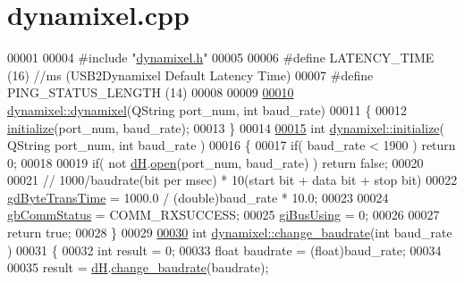 \hypertarget{a00012_source}{}\section{dynamixel.\+cpp}
\label{a00012_source}

\begin{DoxyCode}
00001 
00004 \textcolor{preprocessor}{#include "\hyperlink{a00013}{dynamixel.h}"}
00005 
00006 \textcolor{preprocessor}{#define LATENCY\_TIME        (16) //ms (USB2Dynamixel Default Latency Time)}
00007 \textcolor{preprocessor}{#define PING\_STATUS\_LENGTH  (14)}
00008 
00009 
\hypertarget{a00012_source_l00010}{}\hyperlink{a00003_a5d4fed957a4b2d1690c0fa72127f5cbf}{00010} \hyperlink{a00003_a7aa668a213db6a41bede8e08a6fec830}{dynamixel::dynamixel}(QString port\_num, \textcolor{keywordtype}{int} baud\_rate)
00011 \{
00012     \hyperlink{a00003_a87960244d5846ae7583e37d2407eb61e}{initialize}(port\_num, baud\_rate);
00013 \}
00014 
\hypertarget{a00012_source_l00015}{}\hyperlink{a00003_a87960244d5846ae7583e37d2407eb61e}{00015} \textcolor{keywordtype}{int} \hyperlink{a00003_a87960244d5846ae7583e37d2407eb61e}{dynamixel::initialize}( QString port\_num, \textcolor{keywordtype}{int} baud\_rate )
00016 \{
00017     \textcolor{keywordflow}{if}( baud\_rate < 1900 ) \textcolor{keywordflow}{return} 0;
00018 
00019     \textcolor{keywordflow}{if}( not \hyperlink{a00003_ae003cc90ada6d7b70eaa4ea9d42d4deb}{dH}.\hyperlink{a00002_ab631c2a5533125f14db9a8ec1c33aa7c}{open}(port\_num, baud\_rate) ) \textcolor{keywordflow}{return} \textcolor{keyword}{false};
00020     
00021     \textcolor{comment}{// 1000/baudrate(bit per msec) * 10(start bit + data bit + stop bit)}
00022     \hyperlink{a00003_a2173f25c6299da7ddb37ba3d2bf1f738}{gdByteTransTime} = 1000.0 / (double)baud\_rate * 10.0; 
00023 
00024     \hyperlink{a00003_a5b603f6bed7ccc595f1f50bd6a6ebbfc}{gbCommStatus} = COMM\_RXSUCCESS;
00025     \hyperlink{a00003_ad10e0e49f5fef04bf789a89c14cc470a}{giBusUsing} = 0;
00026 
00027     \textcolor{keywordflow}{return} \textcolor{keyword}{true};
00028 \}
00029 
\hypertarget{a00012_source_l00030}{}\hyperlink{a00003_a7554c7889896e29e11a62027d89f3fdf}{00030} \textcolor{keywordtype}{int} \hyperlink{a00003_a7554c7889896e29e11a62027d89f3fdf}{dynamixel::change\_baudrate}(\textcolor{keywordtype}{int} baud\_rate )
00031 \{
00032     \textcolor{keywordtype}{int} result = 0;
00033     \textcolor{keywordtype}{float} baudrate = (float)baud\_rate;
00034     
00035     result = \hyperlink{a00003_ae003cc90ada6d7b70eaa4ea9d42d4deb}{dH}.\hyperlink{a00002_a0eaaa5340bc9dce73cc920dc8befe5b0}{change\_baudrate}(baudrate);

\end{DoxyCode}
